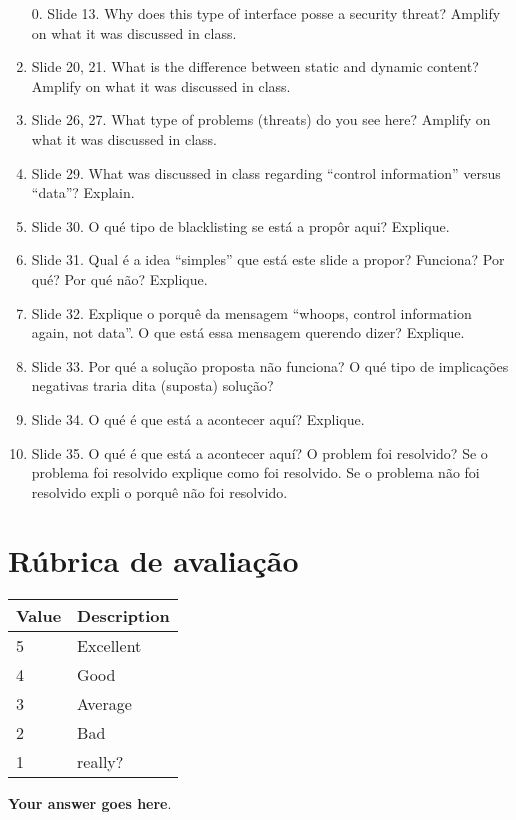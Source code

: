 \documentclass{article}
\begin{document}
\begin{enumerate}
\item[0.]  Slide 13. Why does this type of interface posse a security
  threat? Amplify on what it was discussed in class. 
\item Slide 20, 21. What is the difference between static and dynamic
  content?  Amplify on what it was discussed in class. 
\item Slide 26, 27. What type of problems (threats) do you see here? Amplify on what
  it was discussed in class. 
\item Slide 29. What was discussed in class regarding ``control
  information'' versus ``data''? Explain. 
\item Slide 30. O qué tipo de blacklisting se está a propôr aqui? Explique.
\item Slide 31. Qual é a idea ``simples'' que está este slide a propor? Funciona? Por qué?
  Por qué não? Explique.
\item Slide 32. Explique o porquê da mensagem ``whoops, control information again, not
  data''. O que está essa mensagem querendo dizer? Explique.
\item Slide 33. Por qué a solução proposta não funciona? O qué tipo de implicações
  negativas traria dita (suposta) solução? 
\item Slide 34. O qué é que está a acontecer aquí? Explique. 
\item Slide 35. O qué é que está a acontecer aquí? O problem foi resolvido? Se o
  problema foi resolvido explique como foi resolvido. Se o problema não foi resolvido
  expli o porquê não foi resolvido.
\end{enumerate}

\bigskip



\section*{Rúbrica de avaliação}

\begin{tabular}{|l|p{12cm}|} \hline
  \textbf{Value} & \textbf{Description} \\ \hline
  5 & Excellent \\ \hline
  4 & Good  \\ \hline 
  3 & Average  \\ \hline 
  2 & Bad \\ \hline 
  1 & really? \\ \hline 
\end{tabular}

\bigskip

\textbf{Your answer goes here}.
\end{document}
